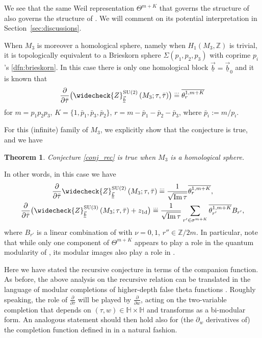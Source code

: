 \documentclass[pdftex]{sigma}
\newcommand{\HH}{\mathbb{H}}
\newcommand{\ZZ}{\mathbb{Z}}
\newcommand{\Zchlong}[3]{\ensuremath{\widecheck{Z}^{#1}_{#2}\left(#3;\tau,\bar{\tau}\right)}}
\def\bv{{\vec{\underline{b}}}}
\newtheorem{thm}{Theorem}[section]
\theoremstyle{definition}
\numberwithin{equation}{section}
\begin{document}
We see that the same Weil representation $\Theta^{m+K}$ that governs the structure of  also governs the structure of . We will comment on its potential interpretation in Section~\ref{sec:discussions}.

When $M_3$ is moreover a homological sphere, namely when $H_1(M_3,\ZZ)$ is trivial, it is topologically equivalent to a Brieskorn sphere $\Sigma(p_1,p_2,p_3)$ with coprime $p_i$'s \eqref{dfn:brieskorn}. In this case there is only one homological block $\bv=\bv_0$ and it is known that \cite{cheng20193d}
 \[
 \frac{\partial}{\partial \bar \tau} \bigl(\Zchlong{{\rm SU}(2)}{\bv}{M_3}\bigr) \stackrel{\dots}{=} \overline{\theta_{r}^{1,m+K}}
 \]
for
$ m=p_1p_2p_3$, $K=\{1,\bar p_1,\bar p_3,\bar p_2\}$, $r=m-\bar p_1-\bar p_2-\bar p_3$,
where $\bar p_i:=m/p_i$.

For this (infinite) family of $M_3$, we explicitly show that the conjecture is true, and we have
\begin{thm}\label{thm:intro_brieskorn_recursive}
Conjecture {\rm \ref{conj_rec}} is true when $M_3$ is a homological sphere.
\end{thm}
In other words, in this case we have
\begin{gather}
 \frac{\partial}{\partial \bar \tau}\Zchlong{{\rm SU}(2)}{\bv}{M_3} \stackrel{\dots}{=} \frac{1}{\sqrt{\operatorname{Im} \tau} }\overline{\theta_{r}^{1,m+K}},\nonumber\\
 \frac{\partial}{\partial \bar \tau}
 \bigl( \Zchlong{{\rm SU}(3)}{\bv}{M_3} + z_{1\rm d} \bigr)
 \stackrel{\dots}{=} \frac{1}{\sqrt{\operatorname{Im} \tau} }\sum_{r' \in \sigma^{m+K}}
 \overline{ \theta^{1,m+K}_{r'}} B_{r' },\label{thm:recursive}
\end{gather}
where $B_{r' }$ is a linear combination of  with $\nu=0,1$, $r''\in \ZZ/2m$. In particular, note that while only one component of $\Theta^{m+K}$ appears to play a role in the quantum modularity of , its modular images also play a role in .

Here we have stated the recursive conjecture in terms of the companion function. As before, the above analysis on the recursive relation can be translated in the language of modular completions of higher-depth false theta functions \cite{Bringmann:2021dxg}. Roughly speaking, the role of $\frac{\partial}{\partial \bar\tau}$ will be played by $\frac{\partial}{\partial w}$, acting on the two-variable completion that depends on $(\tau,w)\in \HH\times \HH$ and transforms as a bi-modular form. An analogous statement should then hold also for (the $\partial_w$ derivatives of) the
 completion function defined in \cite{Bringmann:2021dxg} in a natural fashion.
\end{document}
